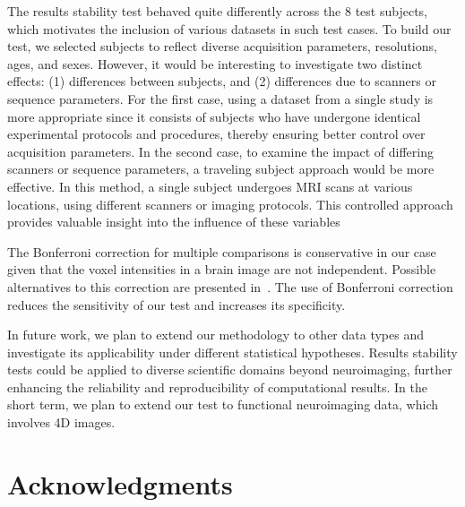 \documentclass[lettersize,journal]{IEEEtran}
\begin{document}
{%
The results stability test behaved quite differently across the 8 test subjects, which motivates the inclusion of various datasets in such test cases.
To build our test, we selected subjects to reflect diverse acquisition parameters, resolutions, ages, and sexes.
However, it would be interesting to investigate two distinct effects: (1) differences between subjects, and (2) differences due to scanners or sequence parameters. For the first case, using a dataset from a single study is more appropriate since it consists of subjects who have undergone identical experimental protocols and procedures, thereby ensuring better control over acquisition parameters.
In the second case, to examine the impact of differing scanners or sequence parameters, a traveling subject approach would be more effective. In this method, a single subject undergoes MRI scans at various locations, using different scanners or imaging protocols. This controlled approach provides valuable insight into the influence of these variables

The Bonferroni correction for multiple comparisons is conservative in our case given that the voxel intensities in a brain image are not independent.
Possible alternatives to this correction are presented in~\cite{NICHOLS2007246}. The use of Bonferroni correction reduces the sensitivity of our test and increases its specificity.

In future work, we plan to extend our methodology to other data types and investigate its applicability under different statistical hypotheses.
Results stability tests could be applied to diverse scientific domains beyond neuroimaging, further enhancing the reliability and reproducibility of computational results. In the short term, we plan to extend our test to functional neuroimaging data, which involves 4D images.


\section*{Acknowledgments}

}
\end{document}
